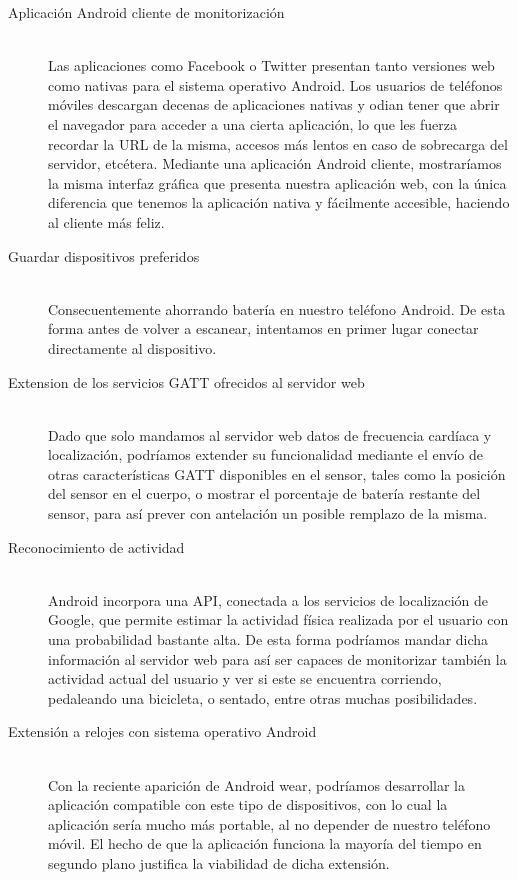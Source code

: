  \begin{description}
	\item[Aplicación Android cliente de monitorización] \hfill \\	
	Las aplicaciones como Facebook o Twitter presentan tanto versiones web como nativas para el sistema operativo Android. Los usuarios de teléfonos móviles descargan decenas de aplicaciones nativas y odian tener que abrir el navegador para acceder a una cierta aplicación, lo que les fuerza recordar la URL de la misma, accesos más lentos en caso de sobrecarga del servidor, etcétera. Mediante una aplicación Android cliente, mostraríamos la misma interfaz gráfica que presenta nuestra aplicación web, con la única diferencia que tenemos la aplicación nativa y fácilmente accesible, haciendo al cliente más feliz.
	
	\item[Guardar dispositivos preferidos]\hfill\\
	Consecuentemente ahorrando batería en nuestro teléfono Android. De esta forma antes de volver a escanear, intentamos en primer lugar conectar directamente al dispositivo.
	
	\item[Extension de los servicios GATT ofrecidos al servidor web]\hfill\\
	Dado que solo mandamos al servidor web datos de frecuencia cardíaca y localización, podríamos extender su funcionalidad mediante el envío de otras características GATT disponibles en el sensor, tales como la posición del sensor en el cuerpo, o mostrar el porcentaje de batería restante del sensor, para así prever con antelación un posible remplazo de la misma.
	
	\item[Reconocimiento de actividad]\hfill \\	
	Android incorpora una API, conectada a los servicios de localización de Google, que permite estimar la actividad física realizada por el usuario con una probabilidad bastante alta. De esta forma podríamos mandar dicha información al servidor web para así ser capaces de monitorizar también la actividad actual del usuario y ver si este se encuentra corriendo, pedaleando una bicicleta, o sentado, entre otras muchas posibilidades.
	
	\item[Extensión a relojes con sistema operativo Android]\hfill\\
	Con la reciente aparición de Android wear, podríamos desarrollar la aplicación compatible con este tipo de dispositivos, con lo cual la aplicación sería mucho más portable, al no depender de nuestro teléfono móvil. El hecho de que la aplicación funciona la mayoría del tiempo en segundo plano justifica la viabilidad de dicha extensión.
	

\end{description}
